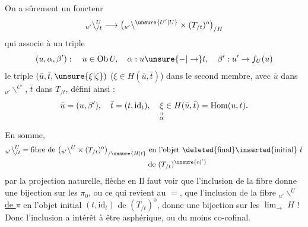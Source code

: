 On a sûrement un foncteur
\[
{}_{u'}\backslash^{U}_{/t}\longrightarrow
\bigl({}_{u'}\backslash^{\unsure{U'|U}}\times(T_{/t})^{\mathrm o}\bigr)_{/H}
\]
qui associe à un triple
\[
(u,\alpha,\beta'):\quad u\in\operatorname{Ob}U,\quad\alpha:u\unsure{-|\to}t,\quad
\beta':u'\to f_U(u)
\]
le triple $(\bar u,\bar t,\unsure{\xi|\zeta})$ ($\xi\in H(\bar u,\bar t)$)  dans
le second membre, avec $\bar u$ dans $\mathord{}_{u'}\backslash^{U'}$, $\bar t$ dans $T_{/t}$,
défini ainsi :
\[
\bar u=(u,\beta'),\quad \bar t=(t,\mathrm{id}_t),\quad
\underset{\substack{\shortparallel\\\alpha}}{\xi}\in H(\bar u,\bar t)=\operatorname{Hom}(u,t).
\]

En somme,
\[
\begin{aligned}
{}_{u'}\backslash^{U}_{/t}&=\text{fibre de }\bigl({}_{u'}\backslash^{U}\times(T_{/t})^{\mathrm o}\bigr)_{/\unsure{H|t}}
\text{ en l'objet \deleted{final}\inserted{initial} }\bar t\\
&\hspace{17em}\text{de }(T_{/t})^{\unsure{\mathrm o|'}}
\end{aligned}
\]
par la projection naturelle, flèche en
Il faut voir que l'inclusion de la fibre donne
une bijection sur les $\pi_0$, ou ce qui revient
au $=$, que l'inclusion de la fibre
$\mathord{}_{u'}\backslash^{U}$ \uline{de $\pi$} en l'objet initial $(t,\mathrm{id}_t)$ de $(T_{/t})^{\mathrm o}$,
donne une bijection sur les $\lim_{\rightarrow}$ 
 $H$ !\unsure{!} Donc l'inclusion a intérêt
à être asphérique, ou du moins co-cofinal.
